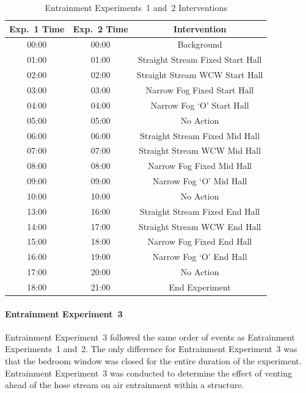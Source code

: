 \documentclass[12pt,oneside]{book}
\begin{document}

\begin{table}[H]
	\centering
	\caption{Entrainment Experiments~1 and~2 Interventions}
	\begin{tabular}{|c|c|c|} 
		\hline
		Exp.~1 Time 	& 	Exp.~2 Time 	& 	Intervention 	\\ \hline \hline
			00:00 		& 	00:00  			& 	Background	\\ \hline
			01:00	 	& 	01:00  			& 	Straight Stream Fixed Start Hall 	\\ \hline
			02:00		& 	02:00  			& 	Straight Stream WCW Start Hall 	\\ \hline
			03:00	 	& 	03:00  			& 	Narrow Fog Fixed Start Hall 	\\ \hline
			04:00		& 	04:00  			& 	Narrow Fog `O' Start Hall 	\\ \hline
			05:00		& 	05:00  			&	No Action 	\\ \hline
			06:00		& 	06:00  			& 	Straight Stream Fixed Mid Hall 	\\ \hline
			07:00		& 	07:00  			& 	Straight Stream WCW Mid Hall 	\\ \hline
			08:00		& 	08:00  			& 	Narrow Fog Fixed Mid Hall 	\\ \hline
			09:00		& 	09:00  			& 	Narrow Fog `O' Mid Hall 	\\ \hline
			10:00		& 	10:00  			& 	No Action 	\\ \hline
			13:00		& 	16:00  			& 	Straight Stream Fixed End Hall 	\\ \hline
			14:00		& 	17:00  			& 	Straight Stream WCW End Hall 	\\ \hline
			15:00		& 	18:00  			& 	Narrow Fog Fixed End Hall 	\\ \hline
			16:00		& 	19:00  			& 	Narrow Fog `O' End Hall 	\\ \hline
			17:00		& 	20:00  			& 	No Action 	\\ \hline
			18:00		& 	21:00  			& 	End Experiment 	\\ \hline
	\end{tabular}
	\label{Table:EntExp1_and_2_Interventions}
\end{table}

\FloatBarrier

\paragraph{Entrainment Experiment~3} \mbox{}
Entrainment Experiment~3 followed the same order of events as Entrainment Experiments~1 and~2. The only difference for Entrainment Experiment~3 was that the bedroom window was closed for the entire duration of the experiment. Entrainment Experiment~3 was conducted to determine the effect of venting ahead of the hose stream on air entrainment within a structure. 
\end{document}
